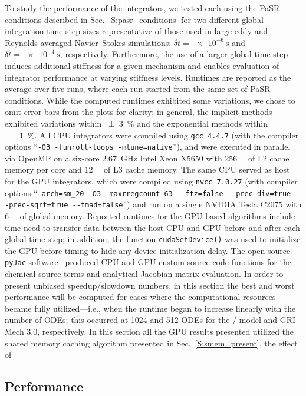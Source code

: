 \documentclass[preprint]{elsarticle}
\begin{document}
To study the performance of the integrators, we tested each using the PaSR conditions described in Sec.~\ref{S:pasr_conditions} for two different global integration time-step sizes representative of those used in large eddy and Reynolds-averaged Navier--Stokes simulations: $\delta t = \SI{e-6}{\s}$ and $\delta t = \SI{e-4}{\s}$, respectively.
Furthermore, the use of a larger global time step induces additional stiffness for a given mechanism and enables evaluation of integrator performance at varying stiffness levels.
Runtimes are reported as the average over five runs, where each run started from the same set of PaSR conditions.
While the computed runtimes exhibited some variations, we chose to omit error bars from the plots for clarity; in general, the implicit methods exhibited variations within \SI{\pm3}{\percent} and the exponential methods within \SI{\pm1}{\percent}.
All CPU integrators were compiled using \texttt{gcc 4.4.7} (with the compiler options ``\texttt{-O3 -funroll-loops -mtune=native}''), and were executed in parallel via OpenMP on a six-core \SI{2.67}{\giga\hertz} Intel Xeon X5650 with \SI{256}{\kilo\byte} of L2 cache memory per core and \SI{12}{\mega\byte} of L3 cache memory.
The same CPU served as host for the GPU integrators, which were compiled using \texttt{nvcc 7.0.27} (with compiler options ``\texttt{-arch=sm\_20 -O3 -maxrregcount 63 -{}-ftz=false -{}-prec-div=true -{}-prec-sqrt=true -{}-fmad=false}'') and run on a single NVIDIA Tesla C2075 with \SI{6}{\giga\byte} of global memory.
Reported runtimes for the GPU-based algorithms include time need to transfer data between the host CPU and GPU before and after each global time step; in addition, the function \texttt{cudaSetDevice()} was used to initialize the GPU before timing to hide any device initialization delay.
The open-source \texttt{pyJac} software~\cite{Niemeyer:2015im,Niemeyer:2015ws} produced CPU and GPU custom source-code functions for the chemical source terms and analytical Jacobian matrix evaluation.
In order to present unbiased speedup\slash slowdown numbers, in this section the best and worst performance will be computed for cases where the computational resources became fully utilized---i.e., when the runtime began to increase linearly with the number of ODEs; this occurred at \num{1024} and \num{512} ODEs for the \slash{} model and GRI-Mech 3.0, respectively.
In this section all the GPU results presented utilized the shared memory caching algorithm presented in Sec.~\ref{S:smem_present}, the effect of 

\subsection{Performance}
\end{document}
